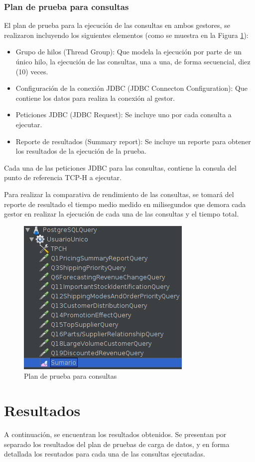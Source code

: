 \documentclass[11pt, twocolumns]{article}
\begin{document}
\begin{multicols}{2}
\subsubsection{Plan de prueba para consultas}
El plan de prueba para la ejecución de las consultas en ambos gestores, se realizaron incluyendo los siguientes elementos (como se muestra en la Figura \ref{figura:plan_consultas_pg}):
\begin{itemize}
  \item Grupo de hilos (Thread Group): Que modela la ejecución por parte de un único hilo, la ejecución de las consultas, una a una, de forma secuencial, diez (10) veces.
  \item Configuración de la conexión JDBC (JDBC Connecton Configuration): Que contiene los datos para realiza la conexión al gestor. 
  \item Peticiones JDBC (JDBC Request): Se incluye uno por cada consulta a ejecutar.
  \item Reporte de resultados (Summary report): Se incluye un reporte para obtener los resultados de la ejecución de la prueba.
\end{itemize}
Cada una de las peticiones JDBC para las consultas, contiene la consula del punto de referencia TCP-H a ejecutar.
\par
Para realizar la comparativa de rendimiento de las consultas, se tomará del reporte de resultado el tiempo medio medido en milisegundos que demora cada gestor en realizar la ejecución de cada una de las consultas y el tiempo total.
\begin{figure}[H]
  \includegraphics[scale=0.7]{plan_consultas_pg.png}
  \centering
  \caption{Plan de prueba para consultas}
  \label{figura:plan_consultas_pg}
\end{figure}


\section{Resultados}
A continuación, se encuentran los resultados obtenidos. Se presentan por separado los resultados del plan de pruebas de carga de datos, y en forma detallada los resutados para cada una de las consultas ejecutadas.


\end{multicols}
\end{document}

